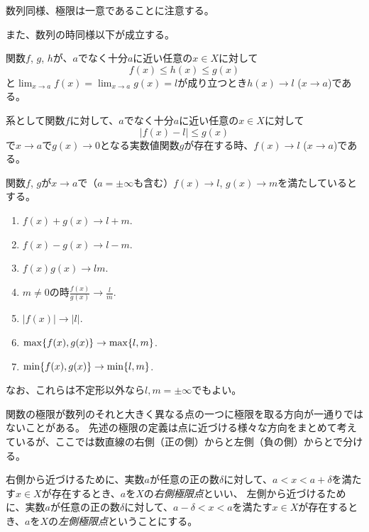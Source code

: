 数列同様、極限は一意であることに注意する。

また、数列の時同様以下が成立する。

\begin{proposition}[はさみうちの原理]
関数$f$, $g$, $h$が、$a$でなく十分$a$に近い任意の$x \in X$に対して
$$
f(x) \le h(x) \le g(x)
$$
と$\lim_{x \to a}f(x) = \lim_{x \to a}g(x) = l$が成り立つとき$h(x) \to l$ ($x \to a$)である。

系として関数$f$に対して、$a$でなく十分$a$に近い任意の$x \in X$に対して
$$
|f(x)-l| \le g(x)
$$
で$x \to a$で$g(x) \to 0$となる実数値関数$g$が存在する時、$f(x) \to l$ ($x \to a$)である。
\end{proposition}

\begin{proposition}[極限と演算]
関数$f$, $g$が$x \to a$で（$a = \pm \infty$も含む）$f(x) \to l$, $g(x) \to m$を満たしているとする。
\begin{enumerate}
\item
$f(x)+g(x) \to l+m$.
\item
$f(x)-g(x) \to l-m$.
\item
$f(x)g(x) \to l m$.
\item
$m \ne 0$の時$\frac{f(x)}{g(x)} \to \frac{l}{m}$.
\item
$|f(x)| \to |l|$.
\item
$\max\{ f(x), g(x) \} \to \max\{ l, m \}$.
\item
$\min\{ f(x), g(x) \} \to \min\{ l, m \}$.
\end{enumerate}
なお、これらは不定形以外なら$l, m = \pm \infty$でもよい。
\end{proposition}

関数の極限が数列のそれと大きく異なる点の一つに極限を取る方向が一通りではないことがある。
先述の極限の定義は点に近づける様々な方向をまとめて考えているが、ここでは数直線の右側（正の側）からと左側（負の側）からとで分ける。

右側から近づけるために、実数$a$が任意の正の数$\delta$に対して、$a < x < a+\delta$を満たす$x \in X$が存在するとき、$a$を$X$の\emph{右側極限点}といい、
左側から近づけるために、実数$a$が任意の正の数$\delta$に対して、$a-\delta < x < a$を満たす$x \in X$が存在するとき、$a$を$X$の\emph{左側極限点}ということにする。

